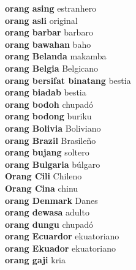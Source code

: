 \textbf{ orang asing  } estranhero \\
\textbf{ orang asli  } original \\
\textbf{ orang barbar  } barbaro \\
\textbf{ orang bawahan  } baho \\
\textbf{ orang Belanda  } makamba \\
\textbf{ orang Belgia  } Belgicano \\
\textbf{ orang bersifat binatang  } bestia \\
\textbf{ orang biadab  } bestia \\
\textbf{ orang bodoh  } chupadó \\
\textbf{ orang bodong  } buriku \\
\textbf{ orang Bolivia  } Boliviano \\
\textbf{ orang Brazil  } Brasileño \\
\textbf{ orang bujang  } soltero \\
\textbf{ orang Bulgaria  } búlgaro \\
\textbf{ Orang Cili  } Chileno \\
\textbf{ Orang Cina  } chinu \\
\textbf{ orang Denmark  } Danes \\
\textbf{ orang dewasa  } adulto \\
\textbf{ orang dungu  } chupadó \\
\textbf{ orang Ecuardor  } ekuatoriano \\
\textbf{ orang Ekuador  } ekuatoriano \\
\textbf{ orang gaji  } kria \\
